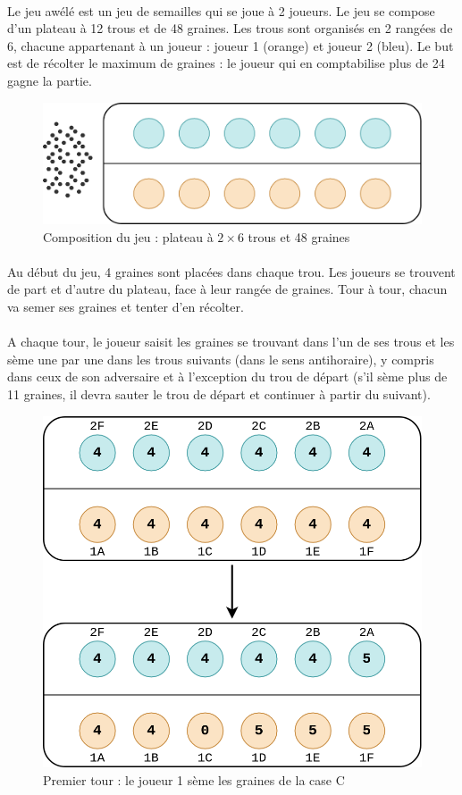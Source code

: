 \documentclass{article}
\begin{document}
    \paragraph{}
    Le jeu awélé est un jeu de semailles qui se joue à 2 joueurs.     Le jeu se compose d'un plateau à 12 trous et de 48 graines. Les trous sont organisés en 2 rangées de 6, chacune appartenant à un joueur : joueur 1 (orange) et joueur 2 (bleu). Le but est de récolter le maximum de graines : le joueur qui en comptabilise plus de 24 gagne la partie.

    \begin{figure}[H]
        \centering
        \includegraphics[width=.55\linewidth]{./images/rules-composition.png}
        \caption{Composition du jeu : plateau à $2 \times 6$ trous et 48 graines}
    \end{figure}

    \paragraph{}
    Au début du jeu, 4 graines sont placées dans chaque trou. Les joueurs se trouvent de part et d'autre du plateau, face à leur rangée de graines. Tour à tour, chacun va semer ses graines et tenter d'en récolter. 
    
    \paragraph{}
    A chaque tour, le joueur saisit les graines se trouvant dans l'un de ses trous et les sème une par une dans les trous suivants (dans le sens antihoraire), y compris dans ceux de son adversaire et à l'exception du trou de départ (s'il sème plus de 11 graines, il devra sauter le trou de départ et continuer à partir du suivant).

    \begin{figure}[H]
        \centering
        \includegraphics[width=.55\linewidth]{./images/tour1.png}
        \caption{Premier tour : le joueur 1 sème les graines de la case C}
    \end{figure}
\end{document}

